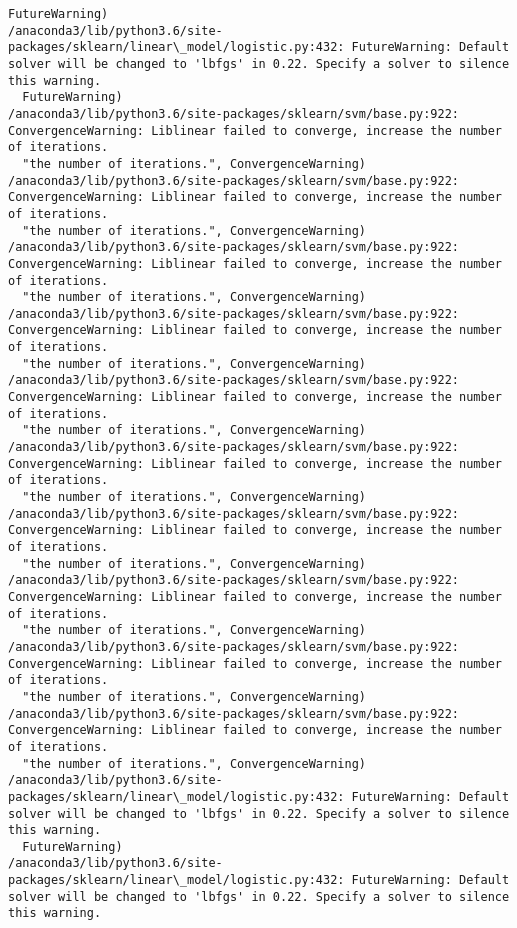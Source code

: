 \documentclass[11pt]{article}
\begin{document}
\begin{Verbatim}[commandchars=\\\{\}]
  FutureWarning)
/anaconda3/lib/python3.6/site-packages/sklearn/linear\_model/logistic.py:432: FutureWarning: Default solver will be changed to 'lbfgs' in 0.22. Specify a solver to silence this warning.
  FutureWarning)
/anaconda3/lib/python3.6/site-packages/sklearn/svm/base.py:922: ConvergenceWarning: Liblinear failed to converge, increase the number of iterations.
  "the number of iterations.", ConvergenceWarning)
/anaconda3/lib/python3.6/site-packages/sklearn/svm/base.py:922: ConvergenceWarning: Liblinear failed to converge, increase the number of iterations.
  "the number of iterations.", ConvergenceWarning)
/anaconda3/lib/python3.6/site-packages/sklearn/svm/base.py:922: ConvergenceWarning: Liblinear failed to converge, increase the number of iterations.
  "the number of iterations.", ConvergenceWarning)
/anaconda3/lib/python3.6/site-packages/sklearn/svm/base.py:922: ConvergenceWarning: Liblinear failed to converge, increase the number of iterations.
  "the number of iterations.", ConvergenceWarning)
/anaconda3/lib/python3.6/site-packages/sklearn/svm/base.py:922: ConvergenceWarning: Liblinear failed to converge, increase the number of iterations.
  "the number of iterations.", ConvergenceWarning)
/anaconda3/lib/python3.6/site-packages/sklearn/svm/base.py:922: ConvergenceWarning: Liblinear failed to converge, increase the number of iterations.
  "the number of iterations.", ConvergenceWarning)
/anaconda3/lib/python3.6/site-packages/sklearn/svm/base.py:922: ConvergenceWarning: Liblinear failed to converge, increase the number of iterations.
  "the number of iterations.", ConvergenceWarning)
/anaconda3/lib/python3.6/site-packages/sklearn/svm/base.py:922: ConvergenceWarning: Liblinear failed to converge, increase the number of iterations.
  "the number of iterations.", ConvergenceWarning)
/anaconda3/lib/python3.6/site-packages/sklearn/svm/base.py:922: ConvergenceWarning: Liblinear failed to converge, increase the number of iterations.
  "the number of iterations.", ConvergenceWarning)
/anaconda3/lib/python3.6/site-packages/sklearn/svm/base.py:922: ConvergenceWarning: Liblinear failed to converge, increase the number of iterations.
  "the number of iterations.", ConvergenceWarning)
/anaconda3/lib/python3.6/site-packages/sklearn/linear\_model/logistic.py:432: FutureWarning: Default solver will be changed to 'lbfgs' in 0.22. Specify a solver to silence this warning.
  FutureWarning)
/anaconda3/lib/python3.6/site-packages/sklearn/linear\_model/logistic.py:432: FutureWarning: Default solver will be changed to 'lbfgs' in 0.22. Specify a solver to silence this warning.

\end{Verbatim}
\end{document}
